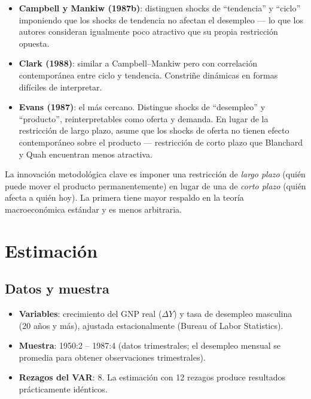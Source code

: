 \documentclass[12pt]{article}
\begin{document}
\begin{itemize}
  \item \textbf{Campbell y Mankiw (1987b)}: distinguen shocks de ``tendencia'' y ``ciclo'' imponiendo que los shocks de tendencia no afectan el desempleo --- lo que los autores consideran igualmente poco atractivo que su propia restricci\'on opuesta.
  \item \textbf{Clark (1988)}: similar a Campbell--Mankiw pero con correlaci\'on contempor\'anea entre ciclo y tendencia. Constriñe din\'amicas en formas dif\'iciles de interpretar.
  \item \textbf{Evans (1987)}: el m\'as cercano. Distingue shocks de ``desempleo'' y ``producto'', reinterpretables como oferta y demanda. En lugar de la restricci\'on de largo plazo, asume que los shocks de oferta no tienen efecto contempor\'aneo sobre el producto --- restricci\'on de corto plazo que Blanchard y Quah encuentran menos atractiva.
\end{itemize}

\begin{intuicion}
La innovaci\'on metodol\'ogica clave es imponer una restricci\'on de \emph{largo plazo} (qui\'en puede mover el producto permanentemente) en lugar de una de \emph{corto plazo} (qui\'en afecta a qui\'en hoy). La primera tiene mayor respaldo en la teor\'ia macroecon\'omica est\'andar y es menos arbitraria.
\end{intuicion}

\section{Estimaci\'on}

\subsection{Datos y muestra}

\begin{itemize}
  \item \textbf{Variables}: crecimiento del GNP real ($\Delta Y$) y tasa de desempleo masculina (20 a\~nos y m\'as), ajustada estacionalmente (Bureau of Labor Statistics).
  \item \textbf{Muestra}: 1950:2 -- 1987:4 (datos trimestrales; el desempleo mensual se promedia para obtener observaciones trimestrales).
  \item \textbf{Rezagos del VAR}: 8. La estimaci\'on con 12 rezagos produce resultados pr\'acticamente id\'enticos.
\end{itemize}
\end{document}
